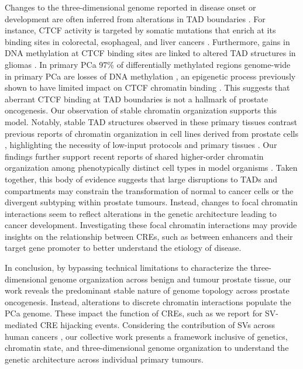 Changes to the three-dimensional genome reported in disease onset or development are often inferred from alterations in TAD boundaries \cite{oudelaarRelationshipGenomeStructure2020,akdemirDisruptionChromatinFolding2020}.
For instance,  CTCF activity is targeted by somatic mutations that enrich at its binding sites in colorectal, esophageal, and liver cancers \cite{katainenCTCFCohesinbindingSites2015,guoMutationHotspotsCTCF2018}.
Furthermore, gains in DNA methylation at CTCF binding sites are linked to altered TAD structures in gliomas \cite{flavahanInsulatorDysfunctionOncogene2016}.
In primary PCa 97\% of differentially methylated regions genome-wide in primary PCa are losses of DNA methylation \cite{zhaoDNAMethylationLandscape2020,yuWholeGenomeMethylationSequencing2013}, an epigenetic process previously shown to have limited impact on CTCF chromatin binding \cite{mauranoRoleDNAMethylation2015}.
This suggests that aberrant CTCF binding at TAD boundaries is not a hallmark of prostate oncogenesis.
Our observation of stable chromatin organization supports this model.
Notably, stable TAD structures observed in these primary tissues contrast previous reports of chromatin organization in cell lines derived from prostate cells \cite{taberlayThreedimensionalDisorganizationCancer2016,rhieHighresolution3DEpigenomic2019}, highlighting the necessity of low-input protocols and primary tissues \cite{diazChromatinConformationAnalysis2018}.
Our findings further support recent reports of shared higher-order chromatin organization among phenotypically distinct cell types in model organisms \cite{rao3DMapHuman2014,dixonTopologicalDomainsMammalian2012,ing-simmonsIndependenceChromatinConformation2021,ghavi-helmHighlyRearrangedChromosomes2019,iyyankiSubtypeassociatedEpigenomicLandscape2021,akdemirDisruptionChromatinFolding2020}.
Taken together, this body of evidence suggests that large disruptions to TADs and compartments may constrain the transformation of normal to cancer cells or the divergent subtyping within prostate tumours.
Instead, changes to focal chromatin interactions seem to reflect alterations in the genetic architecture leading to cancer development.
Investigating these focal chromatin interactions may provide insights on the relationship between CREs, such as between enhancers and their target gene promoter \cite{gasperiniComprehensiveCatalogueValidated2020,nasserGenomewideEnhancerMaps2021} to better understand the etiology of disease.

In conclusion, by bypassing technical limitations to characterize the three-dimensional genome organization across benign and tumour prostate tissue, our work reveals the predominant stable nature of genome topology across prostate oncogenesis.
Instead, alterations to discrete chromatin interactions populate the PCa genome.
These impact the function of CREs, such as we report for SV-mediated CRE hijacking events.
Considering the contribution of SVs across human cancers \cite{hanahanHallmarksCancerNext2011}, our collective work presents a framework inclusive of genetics, chromatin state, and three-dimensional genome organization to understand the genetic architecture across individual primary tumours.
